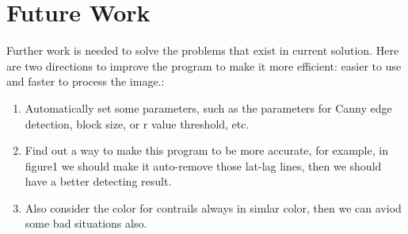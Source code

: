 \chapter{Future Work}

Further work is needed to solve the problems that exist in current solution. Here are two directions to improve the program to make it more efficient: easier to use and faster to process the image.:
\begin{enumerate}
\item Automatically set some parameters, such as the parameters for Canny edge detection, block size, or r value threshold, etc.
\item Find out a way to make this program to be more accurate, for example, in figure1 we should make it auto-remove those lat-lag lines, then we should have a better detecting result.
\item Also consider the color for contrails always in simlar color, then we can aviod some bad situations also.
\end{enumerate}
